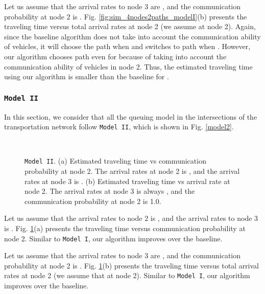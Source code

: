 \documentclass[conference]{IEEEtran}
\newcommand{\modelI}{{\tt{Model I}}}
\newcommand{\modelII}{{\tt{Model II}}}
\begin{document}
Let us assume that the arrival rates to node 3 are , and the communication probability at node 2 is . Fig. \ref{fig:sim_4nodes2paths_modelI}(b) presents the traveling time versus total arrival rates at node 2 (we assume  at node 2). Again, since the baseline algorithm does not take into account the communication ability of vehicles, it will choose the path  when  and switches to path  when . However, our algorithm chooses path  even for  because of taking into account the communication ability of vehicles in node 2. Thus, the estimated traveling time using our algorithm is smaller than the baseline for .

\subsubsection{\modelII}
In this section, we consider that all the queuing model in the intersections of the transportation network  follow \modelII, which is shown in Fig. \ref{model2}.

\begin{figure}[t!]
\begin{center}
 \\
\end{center}
\begin{center}
\vspace{-5pt}
\caption{\label{fig:sim_4nodes2paths_modelII} \modelII. (a) Estimated traveling time vs communication probability  at node 2. The arrival rates at node 2 is , and the arrival rates at node 3 is . (b) Estimated traveling time vs arrival rate at node 2. The arrival rates at node 3 is always , and the communication probability  at node 2 is 1.0.}
\vspace{-25pt}
\end{center}
\end{figure}



Let us assume that the arrival rates to node 2 is , and the arrival rates to node 3 is . Fig. \ref{fig:sim_4nodes2paths_modelII}(a) presents the
traveling time versus communication probability  at node 2. Similar to \modelI, our algorithm improves over the baseline.



Let us assume that the arrival rates to node 3 are , and the communication probability at node 2 is . Fig. \ref{fig:sim_4nodes2paths_modelII}(b) presents the traveling time versus total arrival rates at node 2 (we assume that  at node 2). Similar to \modelI, our algorithm improves over the baseline. 
\end{document}
